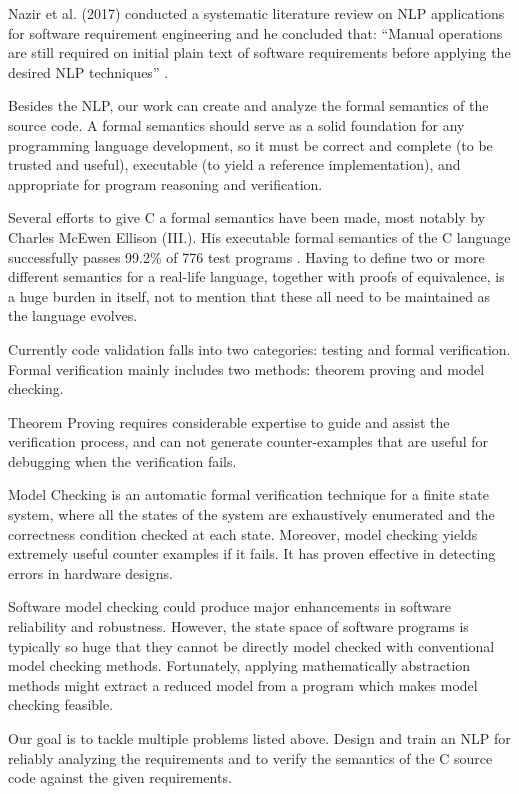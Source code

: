 \begin{multicols}{2}
	Nazir et al. (2017) conducted a systematic literature review on \gls{NLP} applications for software requirement engineering and he concluded that: “Manual operations are still required on initial plain text of software requirements before applying the desired \gls{NLP} techniques” \cite{Nazir}.
	
	Besides the \gls{NLP}, our work can create and analyze the formal semantics of the source code.  A formal semantics should serve as a solid foundation for any programming language development, so it must be correct and complete (to be trusted and useful), executable (to yield a reference implementation), and appropriate for program reasoning and verification.
	
	Several efforts to give C a formal semantics have been made, most notably by Charles McEwen Ellison (III.). His executable formal semantics of the C language successfully passes  99.2\% of 776 test programs \cite{Ellison:2012:EFS:2103621.2103719}. Having to define two or more different semantics for a real-life language, together with proofs of equivalence, is a huge burden in itself, not to mention that these all need to be maintained as the language evolves.
	
	Currently code validation falls into two categories: testing and formal verification. Formal verification mainly includes two methods: theorem proving and model checking.
	
	Theorem Proving requires considerable expertise to guide and assist the verification process, and can not generate counter-examples that are useful for debugging when the verification fails.
	
	Model Checking \cite{Clarke:2000:MC:332656} is an automatic formal verification technique for a finite state system, where all the states of the system are exhaustively enumerated and the correctness condition checked at each state. Moreover, model checking yields extremely useful counter examples if it fails. It has proven effective in detecting errors in hardware designs.
	
	Software model checking could produce major enhancements in software reliability and robustness. However, the state space of software programs is typically so huge that they cannot be directly model checked with conventional model checking methods. Fortunately, applying mathematically abstraction methods might extract a reduced model from a program which makes model checking feasible.
	
	Our goal is to tackle multiple problems listed above. Design and train an \gls{NLP} for reliably analyzing the requirements and to verify the semantics of the C source code against the given requirements.
	
\end{multicols}


